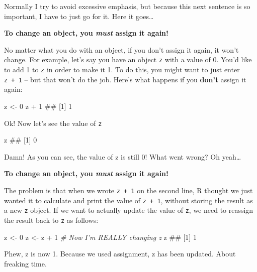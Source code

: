 \documentclass[]{book}
\newenvironment{Shaded}{\begin{snugshade}}{\end{snugshade}}
\newcommand{\DecValTok}[1]{\textcolor[rgb]{0.00,0.00,0.81}{{#1}}}
\newcommand{\StringTok}[1]{\textcolor[rgb]{0.31,0.60,0.02}{{#1}}}
\newcommand{\CommentTok}[1]{\textcolor[rgb]{0.56,0.35,0.01}{\textit{{#1}}}}
\newcommand{\NormalTok}[1]{{#1}}
\theoremstyle{definition}
\theoremstyle{definition}
\theoremstyle{remark}
\begin{document}
Normally I try to avoid excessive emphasis, but because this next
sentence is so important, I have to just go for it. Here it goes\ldots{}

\textbf{To change an object, you \textit{must} assign it again!}

No matter what you do with an object, if you don't assign it again, it
won't change. For example, let's say you have an object \texttt{z} with
a value of 0. You'd like to add 1 to \texttt{z} in order to make it 1.
To do this, you might want to just enter \texttt{z\ +\ 1} -- but that
won't do the job. Here's what happens if you \textbf{don't} assign it
again:

\begin{Shaded}
\begin{Highlighting}[]
\NormalTok{z <-}\StringTok{ }\DecValTok{0}
\NormalTok{z +}\StringTok{ }\DecValTok{1}
\NormalTok{## [1] 1}
\end{Highlighting}
\end{Shaded}

Ok! Now let's see the value of \texttt{z}

\begin{Shaded}
\begin{Highlighting}[]
\NormalTok{z}
\NormalTok{## [1] 0}
\end{Highlighting}
\end{Shaded}

Damn! As you can see, the value of z is still 0! What went wrong? Oh
yeah\ldots{}

\textbf{To change an object, you \emph{must} assign it again!}

The problem is that when we wrote \texttt{z\ +\ 1} on the second line, R
thought we just wanted it to calculate and print the value of
\texttt{z\ +\ 1}, without storing the result as a new \texttt{z} object.
If we want to actually update the value of \texttt{z}, we need to
reassign the result back to \texttt{z} as follows:

\begin{Shaded}
\begin{Highlighting}[]
\NormalTok{z <-}\StringTok{ }\DecValTok{0}
\NormalTok{z <-}\StringTok{ }\NormalTok{z +}\StringTok{ }\DecValTok{1}  \CommentTok{# Now I'm REALLY changing z}
\NormalTok{z}
\NormalTok{## [1] 1}
\end{Highlighting}
\end{Shaded}

Phew, z is now 1. Because we used assignment, z has been updated. About
freaking time.
\end{document}
